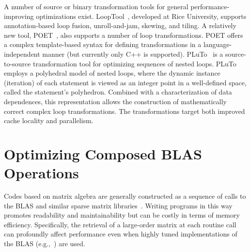 \documentclass[runningheads]{llncs}
\begin{document}

A number of source or binary transformation tools for general
performance-improving optimizations exist. LoopTool~\cite{LoopTool},
developed at Rice University, supports annotation-based loop fusion,
unroll-and-jam, skewing, and tiling.  A relatively new tool, POET~\cite{POET},
also supports a number of loop transformations. POET offers a complex
template-based syntax for defining transformations in a language-independent
manner (but currently only C++ is supported). 
PLuTo~\cite{Pluto}
is a source-to-source transformation tool for
optimizing sequences of nested loops. PLuTo employs a polyhedral model of
nested loops, where the dynamic instance (iteration) of each statement is
viewed as an integer point in a well-defined space, called the statement's
polyhedron. Combined with a characterization of data dependences, this
representation allows the construction of mathematically correct complex loop
transformations. The transformations target both improved cache locality and
parallelism.

\section{Optimizing Composed BLAS Operations}
\label{sec:approach}

Codes based on matrix algebra are generally constructed as a sequence of
calls to the BLAS
and similar
sparse matrix libraries~\cite{Saad:fr}.
Writing programs in
this way promotes readability and maintainability but can be costly in terms
of memory efficiency. Specifically, the retrieval of a large-order matrix at
each routine call can profoundly affect performance even when highly
tuned implementations of the BLAS (e.g.,~\cite{Goto:2006fk})
are used.
\end{document}
